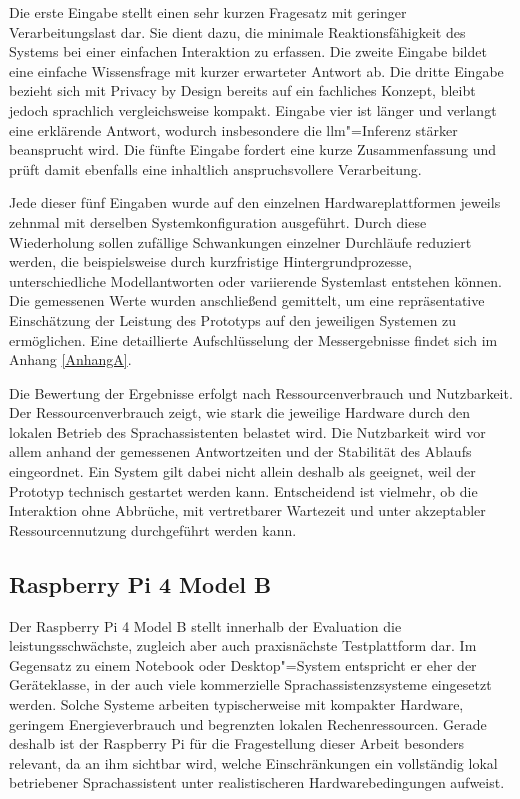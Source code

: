 Die erste Eingabe stellt einen sehr kurzen Fragesatz mit geringer Verarbeitungslast dar. Sie dient dazu, die minimale Reaktionsfähigkeit des Systems bei einer einfachen Interaktion zu erfassen. Die zweite Eingabe bildet eine einfache Wissensfrage mit kurzer erwarteter Antwort ab. Die dritte Eingabe bezieht sich mit Privacy by Design bereits auf ein fachliches Konzept, bleibt jedoch sprachlich vergleichsweise kompakt. Eingabe vier ist länger und verlangt eine erklärende Antwort, wodurch insbesondere die \gls{llm}"=Inferenz stärker beansprucht wird. Die fünfte Eingabe fordert eine kurze Zusammenfassung und prüft damit ebenfalls eine inhaltlich anspruchsvollere Verarbeitung.

Jede dieser fünf Eingaben wurde auf den einzelnen Hardwareplattformen jeweils zehnmal mit derselben Systemkonfiguration ausgeführt. Durch diese Wiederholung sollen zufällige Schwankungen einzelner Durchläufe reduziert werden, die beispielsweise durch kurzfristige Hintergrundprozesse, unterschiedliche Modellantworten oder variierende Systemlast entstehen können. Die gemessenen Werte wurden anschließend gemittelt, um eine repräsentative Einschätzung der Leistung des Prototyps auf den jeweiligen Systemen zu ermöglichen. Eine detaillierte Aufschlüsselung der Messergebnisse findet sich im Anhang \ref{AnhangA}.

Die Bewertung der Ergebnisse erfolgt nach Ressourcenverbrauch und Nutzbarkeit. Der Ressourcenverbrauch zeigt, wie stark die jeweilige Hardware durch den lokalen Betrieb des Sprachassistenten belastet wird. Die Nutzbarkeit wird vor allem anhand der gemessenen Antwortzeiten und der Stabilität des Ablaufs eingeordnet. Ein System gilt dabei nicht allein deshalb als geeignet, weil der Prototyp technisch gestartet werden kann. Entscheidend ist vielmehr, ob die Interaktion ohne Abbrüche, mit vertretbarer Wartezeit und unter akzeptabler Ressourcennutzung durchgeführt werden kann.


\subsection{Raspberry Pi 4 Model B}
\label{subsec:Raspberry_Pi_4_Model_B}
Der Raspberry Pi 4 Model B stellt innerhalb der Evaluation die leistungsschwächste, zugleich aber auch praxisnächste Testplattform dar. Im Gegensatz zu einem Notebook oder Desktop"=System entspricht er eher der Geräteklasse, in der auch viele kommerzielle Sprachassistenzsysteme eingesetzt werden. Solche Systeme arbeiten typischerweise mit kompakter Hardware, geringem Energieverbrauch und begrenzten lokalen Rechenressourcen. Gerade deshalb ist der Raspberry Pi für die Fragestellung dieser Arbeit besonders relevant, da an ihm sichtbar wird, welche Einschränkungen ein vollständig lokal betriebener Sprachassistent unter realistischeren Hardwarebedingungen aufweist.

